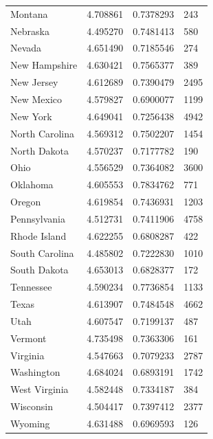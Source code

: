 \documentclass[
  english,
  man]{apa6}
\begin{document}
\begin{landscape}
\begin{longtable}[t]{llll}
\addlinespace
Montana & 4.708861 & 0.7378293 & 243\\
Nebraska & 4.495270 & 0.7481413 & 580\\
Nevada & 4.651490 & 0.7185546 & 274\\
New Hampshire & 4.630421 & 0.7565377 & 389\\
New Jersey & 4.612689 & 0.7390479 & 2495\\
\addlinespace
New Mexico & 4.579827 & 0.6900077 & 1199\\
New York & 4.649041 & 0.7256438 & 4942\\
North Carolina & 4.569312 & 0.7502207 & 1454\\
North Dakota & 4.570237 & 0.7177782 & 190\\
Ohio & 4.556529 & 0.7364082 & 3600\\
\addlinespace
Oklahoma & 4.605553 & 0.7834762 & 771\\
Oregon & 4.619854 & 0.7436931 & 1203\\
Pennsylvania & 4.512731 & 0.7411906 & 4758\\
Rhode Island & 4.622255 & 0.6808287 & 422\\
South Carolina & 4.485802 & 0.7222830 & 1010\\
\addlinespace
South Dakota & 4.653013 & 0.6828377 & 172\\
Tennessee & 4.590234 & 0.7736854 & 1133\\
Texas & 4.613907 & 0.7484548 & 4662\\
Utah & 4.607547 & 0.7199137 & 487\\
Vermont & 4.735498 & 0.7363306 & 161\\
\addlinespace
Virginia & 4.547663 & 0.7079233 & 2787\\
Washington & 4.684024 & 0.6893191 & 1742\\
West Virginia & 4.582448 & 0.7334187 & 384\\
Wisconsin & 4.504417 & 0.7397412 & 2377\\
Wyoming & 4.631488 & 0.6969593 & 126\\*
\end{longtable}
\end{landscape}
\endgroup{}
\end{document}
